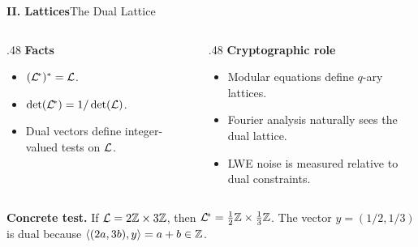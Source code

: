 \begin{frame}[shrink=5]{\textbf{II. Lattices}}{The Dual Lattice}
\begin{columns}[T,onlytextwidth]
\begin{column}{.48\textwidth}
\textcolor{TealDarkCyan}{\textbf{Facts}}
\begin{itemize}
  \item $(\mathcal{L}^{\!*})^{*}=\mathcal{L}$.
  \item $\det(\mathcal{L}^{\!*})=1/\det(\mathcal{L})$.
  \item Dual vectors define integer-valued tests on $\mathcal{L}$.
\end{itemize}
\end{column}
\begin{column}{.48\textwidth}
\textcolor{TealDarkCyan}{\textbf{Cryptographic role}}
\begin{itemize}
  \item Modular equations define $q$-ary lattices.
  \item Fourier analysis naturally sees the dual lattice.
  \item LWE noise is measured relative to dual constraints.
\end{itemize}
\end{column}
\end{columns}
\textbf{Concrete test.}\; If $\mathcal{L}=2\mathbb{Z}\times 3\mathbb{Z}$, then $\mathcal{L}^{\!*}=\frac12\mathbb{Z}\times\frac13\mathbb{Z}$.
The vector $y=(1/2,1/3)$ is dual because
$\left\langle (2a,3b),y\right\rangle=a+b\in\mathbb{Z}$.
\end{frame}

